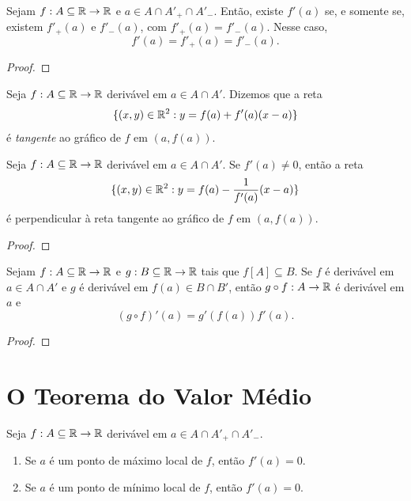 \begin{proposition}
    Sejam $f: A \subseteq \mathbb{R} \to \mathbb{R}$ e $a \in A \cap A'_+ \cap A'_-$. Então, existe $f'(a)$ se, e somente se, existem $f'_+(a)$ e $f'_-(a)$, com $f'_+(a) = f'_-(a)$. Nesse caso,
        \[
            f'(a) = f'_+(a) = f'_-(a).
        \]
\end{proposition}

\begin{proof}
    \blackproof
\end{proof}

\begin{definition}
    Seja $f: A \subseteq \mathbb{R} \to \mathbb{R}$ derivável em $a \in A \cap A'$. Dizemos que a reta
        \[
            \{(x,y) \in \mathbb{R}^2 : y = f(a) + f'(a)(x-a) \}
        \]
    é \emph{tangente} ao gráfico de $f$ em $(a,f(a))$.
\end{definition}

\begin{proposition}
    Seja $f: A \subseteq \mathbb{R} \to \mathbb{R}$ derivável em $a \in A \cap A'$. Se $f'(a) \neq 0$, então a reta
        \[
            \{(x,y) \in \mathbb{R}^2 : y = f(a) - \dfrac{1}{f'(a)}(x-a) \}
        \]
    é perpendicular à reta tangente ao gráfico de $f$ em $(a,f(a))$.
\end{proposition}

\begin{proof}
    \blackproof
\end{proof}

\begin{theorem}
    Sejam $f : A \subseteq \mathbb{R} \to \mathbb{R}$ e $g : B \subseteq \mathbb{R} \to \mathbb{R}$ tais que $f[A] \subseteq B$. Se $f$ é derivável em $a \in A \cap A'$ e $g$ é derivável em $f(a) \in B \cap B'$, então $g \circ f : A \to \mathbb{R}$ é derivável em $a$ e
        \[
            (g \circ f)'(a) = g'(f(a))f'(a).
        \]
\end{theorem}

\begin{proof}
    \blackproof
\end{proof}

\section{O Teorema do Valor Médio}

\begin{theorem}[Fermat] \label{teo.calc1:extremolocalfermat}
    Seja $f: A \subseteq \mathbb{R} \to \mathbb{R}$ derivável em
    $a \in A \cap A'_+ \cap A'_-$.
    \begin{enumerate}[leftmargin=*, align=left, label=\textbf{(\alph*)}]
        \item Se $a$ é um ponto de máximo local de $f$, então $f'(a)=0$.
        \item Se $a$ é um ponto de mínimo local de $f$, então $f'(a)=0$.
    \end{enumerate}
\end{theorem}

